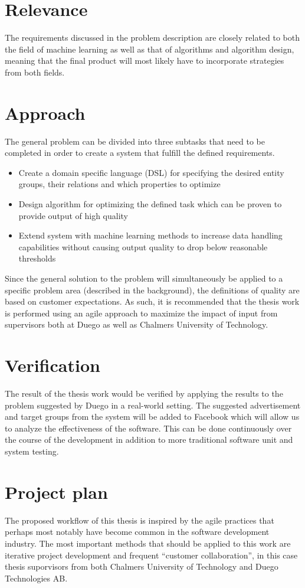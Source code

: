 \documentclass[a4paper]{article}
\begin{document}
\section{Relevance}
The requirements discussed in the problem description are closely related to both the field of machine learning as well as that of algorithms and algorithm design, meaning that the final product will most likely have to incorporate strategies from both fields.

\section{Approach}
\label{sec:approach}
The general problem can be divided into three subtasks that need to be completed in order to create a system that fulfill the defined requirements.
\begin{itemize}
	\item Create a domain specific language (DSL) for specifying the desired entity groups, their relations and which properties to optimize
	\item Design algorithm for optimizing the defined task which can be proven to provide output of high quality 
	\item Extend system with machine learning methods to increase data handling capabilities without causing output quality to drop below reasonable thresholds
\end{itemize}
Since the general solution to the problem will simultaneously be applied to a specific problem area (described in the background), the definitions of quality are based on customer expectations. As such, it is recommended that the thesis work is performed using an agile approach to maximize the impact of input from supervisors both at Duego as well as Chalmers University of Technology.

\section{Verification}
The result of the thesis work would be verified by applying the results to the problem suggested by Duego in a real-world setting. The suggested advertisement and target groups from the system will be added to Facebook which will allow us to analyze the effectiveness of the software. This can be done continuously over the course of the development in addition to more traditional software unit and system testing.

\section{Project plan}
The proposed workflow of this thesis is inspired by the agile practices that perhaps most notably have become 
common in the software development industry. The most important methods that should be applied to this work are
iterative project development and frequent ``customer collaboration'', in this case thesis suporvisors from both
Chalmers University of Technology and Duego Technologies AB.
\end{document}
